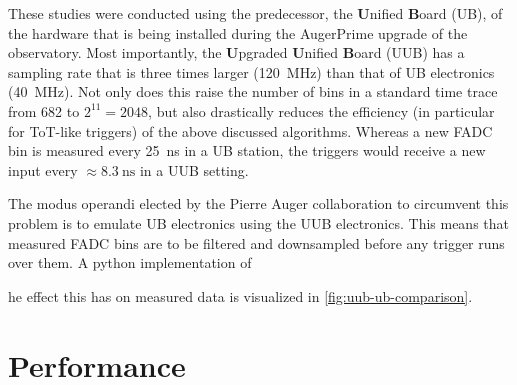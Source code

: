 These studies were conducted using the predecessor, the \textbf{U}nified \textbf{B}oard (UB), of the hardware that is being installed during the AugerPrime upgrade 
of the observatory. Most importantly, the \textbf{U}pgraded \textbf{U}nified \textbf{B}oard (UUB) has a sampling rate that is three times larger
(\SI{120}{\mega\hertz}) than that of UB electronics (\SI{40}{\mega\hertz}). Not only does this raise the number of bins in a standard time trace from 682 to 
$2^{11} = 2048$, but also drastically reduces the efficiency (in particular for ToT-like triggers) of the above discussed algorithms. Whereas a new FADC bin is 
measured every \SI{25}{\nano\second} in a UB station, the triggers would receive a new input every $\approx\SI{8.3}{\nano\second}$ in a UUB setting.

The modus operandi elected by the Pierre Auger collaboration to circumvent this problem is to emulate UB electronics using the UUB electronics. This means that 
measured FADC bins are to be filtered and downsampled before any trigger runs over them. A python implementation of 


he effect this has on measured data is visualized in \autoref{fig:uub-ub-comparison}. 

\section{Performance}
\label{sec:classical-triggers-performance}




